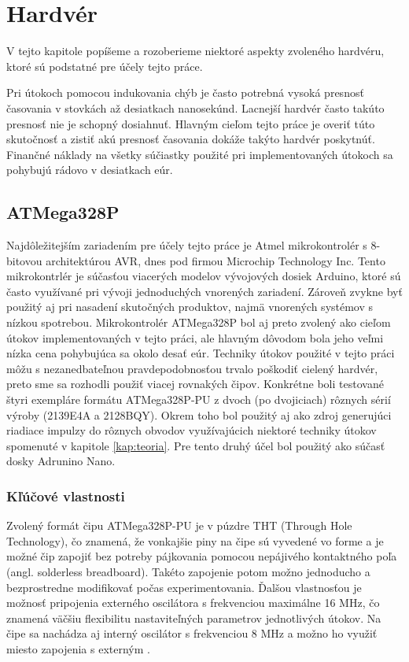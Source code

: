 \chapter{Hardvér}

\label{kap:hardver} %

V tejto kapitole popíšeme a rozoberieme niektoré aspekty zvoleného hardvéru, ktoré sú podstatné pre účely tejto práce.

Pri útokoch pomocou indukovania chýb je často potrebná vysoká presnosť časovania v stovkách až desiatkach nanosekúnd. Lacnejší hardvér často takúto presnosť nie je schopný dosiahnuť. Hlavným cieľom tejto práce je overiť túto skutočnosť a zistiť akú presnosť časovania dokáže takýto hardvér poskytnúť. Finančné náklady na všetky súčiastky použité pri implementovaných útokoch sa pohybujú rádovo v desiatkach eúr.

\section{ATMega328P}
Najdôležitejším zariadením pre účely tejto práce je Atmel mikrokontrolér s 8-bitovou architektúrou AVR, dnes pod firmou Microchip Technology Inc. Tento mikrokontrlér je súčasťou viacerých modelov vývojových dosiek Arduino, ktoré sú často využívané pri vývoji jednoduchých vnorených zariadení. Zároveň zvykne byť použitý aj pri nasadení skutočných produktov, najmä vnorených systémov s nízkou spotrebou. Mikrokontrolér ATMega328P bol aj preto zvolený ako cieľom útokov implementovaných v tejto práci, ale hlavným dôvodom bola jeho veľmi nízka cena pohybujúca sa okolo desať eúr. Techniky útokov použité v tejto práci môžu s nezanedbateľnou pravdepodobnosťou trvalo poškodiť cielený hardvér, preto sme sa rozhodli použiť viacej rovnakých čipov. Konkrétne boli testované štyri exempláre formátu ATMega328P-PU z dvoch (po dvojiciach) rôznych sérií výroby (2139E4A a 2128BQY). Okrem toho bol použitý aj ako zdroj generujúci riadiace impulzy do rôznych obvodov využívajúcich niektoré techniky útokov spomenuté v kapitole \ref{kap:teoria}. Pre tento druhý účel bol použitý ako súčasť dosky Adrunino Nano.

\subsection{Kľúčové vlastnosti}
Zvolený formát čipu ATMega328P-PU je v púzdre THT (Through Hole Technology), čo znamená, že vonkajšie piny na čipe sú vyvedené vo forme  a je možné čip zapojiť bez potreby pájkovania pomocou nepájivého kontaktného poľa (angl. solderless breadboard). Takéto zapojenie potom možno jednoducho a bezprostredne modifikovať počas experimentovania. Ďalšou vlastnosťou je možnosť pripojenia externého oscilátora s frekvenciou maximálne 16 MHz, čo znamená väčšiu flexibilitu nastaviteľných parametrov jednotlivých útokov. Na čipe sa nachádza aj interný oscilátor s frekvenciou 8 MHz a možno ho využiť miesto zapojenia s externým \cite{atmegaData}.

